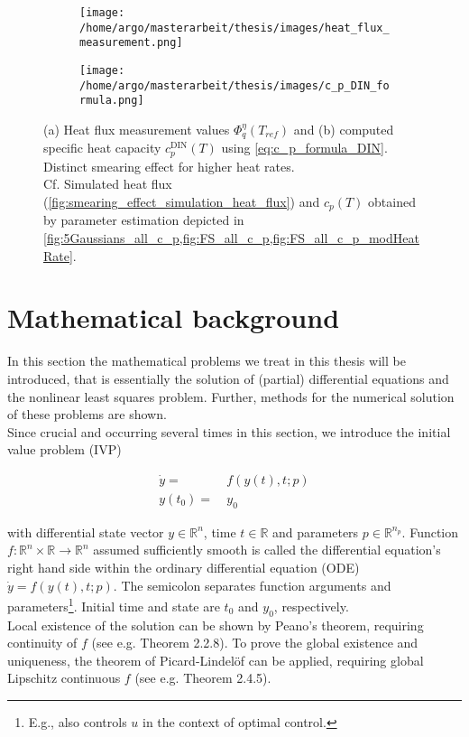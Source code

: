 \documentclass{scrartcl}[12pt, halfparskip]
\numberwithin{equation}{section}
\numberwithin{figure}{section}
\numberwithin{table}{section}
\begin{document}
\begin{figure}[H]
	\centering
	\begin{subfigure}{0.7\textwidth}
		\texttt{[image: /home/argo/masterarbeit/thesis/images/heat\_flux\_measurement.png]}
		\caption{}
		\label{fig:heat_flux_measurements}
	\end{subfigure}
	\begin{subfigure}{0.7\textwidth}
		\texttt{[image: /home/argo/masterarbeit/thesis/images/c\_p\_DIN\_formula.png]}
		\caption{}
		\label{fig:c_p_DIN_formula}
	\end{subfigure}
	\caption{(a) Heat flux measurement values $\varPhi_q^{\eta}(T_{ref})$ and (b) computed specific heat capacity $c_p^{\text{DIN}}(T)$ using \cref{eq:c_p_formula_DIN}. Distinct smearing effect for higher heat rates. \\
	Cf. Simulated heat flux (\cref{fig:smearing_effect_simulation_heat_flux}) and $c_p(T)$ obtained by parameter estimation depicted in \cref{fig:5Gaussians_all_c_p,fig:FS_all_c_p,fig:FS_all_c_p_modHeatRate}.}
\end{figure}


\newpage
\section{Mathematical background}
\label{sec:mathematical_background}

In this section the mathematical problems we treat in this thesis will be introduced, that is essentially the solution of (partial) differential equations and the nonlinear least squares problem. Further, methods for the numerical solution of these problems are shown. \\

Since crucial and occurring several times in this section, we introduce the initial value problem (IVP)

\begin{align}
	\dot{y} = & \ f(y(t), t; p) \label{eq:initial_value_problem_definition} \\
	y(t_0) = & \ y_0 \nonumber
\end{align}

with differential state vector $y \in \mathbb{R}^n$, time $t \in \mathbb{R}$ and parameters $p \in \mathbb{R}^{n_p}$. Function $f: \mathbb{R}^n \times \mathbb{R} \rightarrow \mathbb{R}^n$ assumed sufficiently smooth is called the differential equation's right hand side within the ordinary differential equation (ODE) $\dot{y} = f(y(t), t; p)$. The semicolon separates function arguments and  parameters\footnote{E.g., also controls $u$ in the context of optimal control.}. Initial time and state are $t_0$ and $y_0$, respectively. \\
Local existence of the solution can be shown by Peano's theorem, requiring continuity of $f$ (see e.g. \cite{ODE_analytic} Theorem 2.2.8).
To prove the global existence and uniqueness, the theorem of Picard-Lindelöf can be applied, requiring global Lipschitz continuous $f$ (see e.g. \cite{ODE_analytic} Theorem 2.4.5). \\
\end{document}
